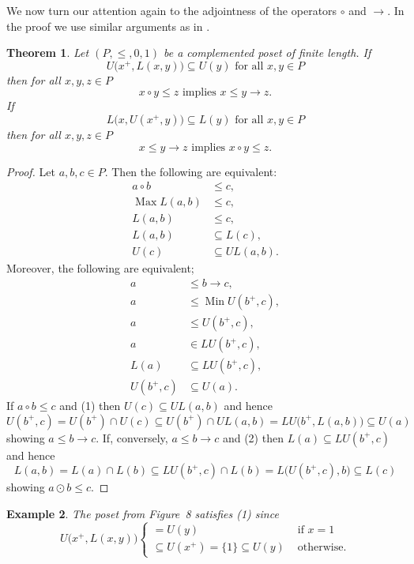 \documentclass[12pt]{article}
\DeclareMathOperator{\Max}{Max}
\DeclareMathOperator{\Min}{Min}
\newtheorem{theorem}{Theorem}[section]
\newtheorem{example}[theorem]{Example}
\begin{document}
We now turn our attention again to the adjointness of the operators $\circ$ and $\to$. In the proof we use similar arguments as in \cite{CL19}.

\begin{theorem}\label{th3}
Let $(P,\le,0,1)$ be a complemented poset of finite length. If
\begin{equation}
U\big(x^+,L(x,y)\big)\subseteq U(y)\text{ for all }x,y\in P
\end{equation}
then for all $x,y,z\in P$
\[
x\circ y\le z\text{ implies }x\le y\to z.
\]
If
\begin{equation}
L\big(x,U(x^+,y)\big)\subseteq L(y)\text{ for all }x,y\in P
\end{equation}
then for all $x,y,z\in P$
\[
x\le y\to z\text{ implies }x\circ y\le z.
\]
\end{theorem}

\begin{proof}
Let $a,b,c\in P$. Then the following are equivalent:
\begin{align*}
   a\circ b & \le c, \\
\Max L(a,b) & \le c, \\
     L(a,b) & \le c, \\
     L(a,b) & \subseteq L(c), \\
       U(c) & \subseteq UL(a,b).
\end{align*}
Moreover, the following are equivalent;
\begin{align*}
a & \le b\to c, \\
a & \le\Min U(b^+,c), \\
a & \le U(b^+,c), \\
a & \in LU(b^+,c), \\
L(a) & \subseteq LU(b^+,c), \\
U(b^+,c) & \subseteq U(a).
\end{align*}
If $a\circ b\le c$ and (1) then $U(c)\subseteq UL(a,b)$ and hence
\[
U(b^+,c)=U(b^+)\cap U(c)\subseteq U(b^+)\cap UL(a,b)=LU\big(b^+,L(a,b)\big)\subseteq U(a)
\]
showing $a\le b\to c$. If, conversely, $a\le b\to c$ and (2) then $L(a)\subseteq LU(b^+,c)$ and hence
\[
L(a,b)=L(a)\cap L(b)\subseteq LU(b^+,c)\cap L(b)=L\big(U(b^+,c),b\big)\subseteq L(c)
\]
showing $a\odot b\le c$.
\end{proof}

\begin{example}
The poset from Figure~8 satisfies {\rm(1)} since
\[
U\big(x^+,L(x,y)\big)\left\{
\begin{array}{ll}
=U(y) 								 & \text{ if }x=1 \\
\subseteq U(x^+)=\{1\}\subseteq U(y) & \text{ otherwise}.
\end{array}
\right.
\]
\end{example}
\end{document}
